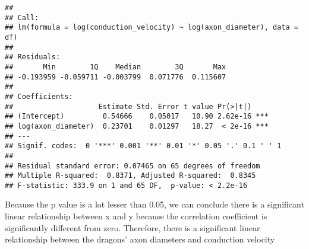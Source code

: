 \documentclass[
]{article}
\begin{document}
\begin{verbatim}
## 
## Call:
## lm(formula = log(conduction_velocity) ~ log(axon_diameter), data = df)
## 
## Residuals:
##       Min        1Q    Median        3Q       Max 
## -0.193959 -0.059711 -0.003799  0.071776  0.115607 
## 
## Coefficients:
##                    Estimate Std. Error t value Pr(>|t|)    
## (Intercept)         0.54666    0.05017   10.90 2.62e-16 ***
## log(axon_diameter)  0.23701    0.01297   18.27  < 2e-16 ***
## ---
## Signif. codes:  0 '***' 0.001 '**' 0.01 '*' 0.05 '.' 0.1 ' ' 1
## 
## Residual standard error: 0.07465 on 65 degrees of freedom
## Multiple R-squared:  0.8371, Adjusted R-squared:  0.8345 
## F-statistic: 333.9 on 1 and 65 DF,  p-value: < 2.2e-16
\end{verbatim}

Because the p value is a lot lesser than 0.05, we can conclude there is
a significant linear relationship between x and y because the
correlation coefficient is significantly different from zero. Therefore,
there is a significant linear relationship between the dragons' axon
diameters and conduction velocity
\end{document}
